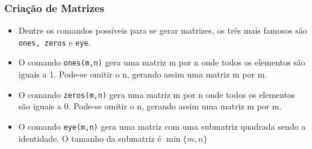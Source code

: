 \documentclass{beamer}
\begin{document}
\begin{frame}
\frametitle{Cria\c{c}\~ao de Matrizes}

\begin{itemize}
\item<1-> Dentre os comandos poss\'iveis para se gerar matrizes, os tr\^es mais famosos s\~ao {\tt ones, zeros} e {\tt eye}.
\item<2-> O comando {\tt ones(m,n)} gera uma matriz m por n onde todos os elementos s\~ao iguais a 1. Pode-se omitir o n, gerando assim uma matriz m por m.
\item<3-> O comando {\tt zeros(m,n)} gera uma matriz m por n onde todos os elementos s\~ao iguais a 0. Pode-se omitir o n, gerando assim uma matriz m por m.
\item<4-> O comando {\tt eye(m,n)} gera uma matriz com uma submatriz quadrada sendo a identidade. O tamanho da submatriz \'e $\min\{m,n\}$
\end{itemize}

\end{frame}
\end{document}

